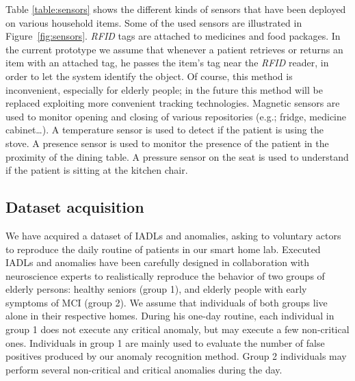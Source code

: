\documentclass[10pt, conference, compsocconf]{IEEEtran}
\begin{document}
Table \ref{table:sensors} shows the different kinds of sensors that have been deployed on various household items. Some of the used sensors are illustrated in Figure~\ref{fig:sensors}. 
\emph{RFID} tags are attached to medicines and food packages. In the current prototype we assume that whenever a patient retrieves or returns an item with an attached tag, he passes the item's tag near the \emph{RFID} reader, in order to let the system identify the object. Of course, this method is inconvenient, especially for elderly people; in the future this method will be replaced exploiting more convenient tracking technologies. 
Magnetic sensors are used to monitor opening and closing of various repositories (e.g.; fridge, medicine cabinet\dots). A temperature sensor is used to detect if the patient is using the stove. A presence sensor is used to monitor the presence of the patient in the proximity of the dining table. A pressure sensor on the seat is used to understand if the patient is sitting at the kitchen chair.




 

\subsection{Dataset acquisition}
We have acquired a dataset of IADLs and anomalies, asking to voluntary actors to reproduce the daily routine of  patients in our smart home lab. Executed IADLs and anomalies have been carefully designed in collaboration with neuroscience experts to realistically reproduce the behavior of two groups of elderly persons:  healthy seniors (group 1), and  elderly people with early symptoms of MCI (group 2). We assume that individuals of both groups live alone in their respective homes. During his one-day routine, each individual in group 1 does not execute any critical anomaly, but may execute a few non-critical ones. Individuals in group 1 are mainly used to evaluate the number of false positives produced by our anomaly recognition method. Group 2 individuals may perform several non-critical and critical anomalies during the day. 
\end{document}
